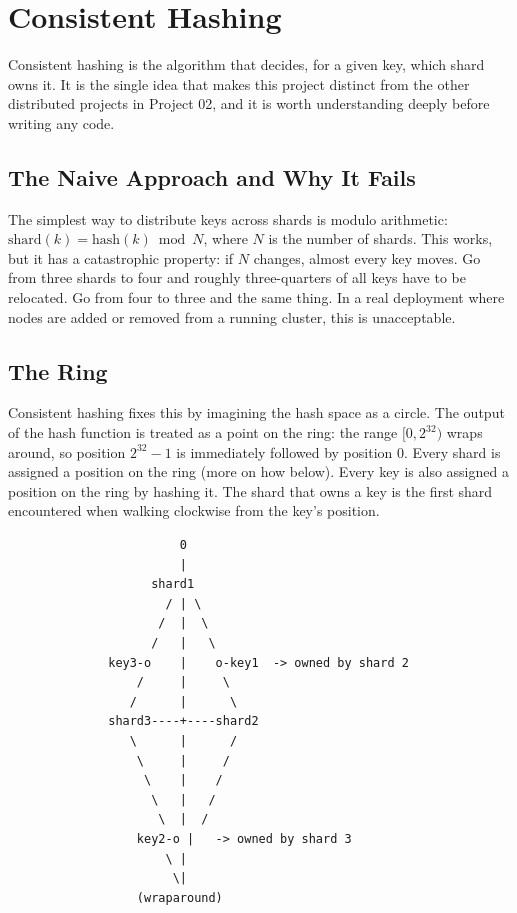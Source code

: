 \documentclass[11pt,a4paper]{article}
\begin{document}
\section{Consistent Hashing}

Consistent hashing is the algorithm that decides, for a given key, which shard owns it. It is the single idea that makes this project distinct from the other distributed projects in Project 02, and it is worth understanding deeply before writing any code.

\subsection{The Naive Approach and Why It Fails}
The simplest way to distribute keys across shards is modulo arithmetic: $\text{shard}(k) = \text{hash}(k) \bmod N$, where $N$ is the number of shards. This works, but it has a catastrophic property: if $N$ changes, almost every key moves. Go from three shards to four and roughly three-quarters of all keys have to be relocated. Go from four to three and the same thing. In a real deployment where nodes are added or removed from a running cluster, this is unacceptable.

\subsection{The Ring}
Consistent hashing fixes this by imagining the hash space as a circle. The output of the hash function is treated as a point on the ring: the range $[0, 2^{32})$ wraps around, so position $2^{32} - 1$ is immediately followed by position 0. Every shard is assigned a position on the ring (more on how below). Every key is also assigned a position on the ring by hashing it. The shard that owns a key is the first shard encountered when walking clockwise from the key's position.

\begin{codebox}
\begin{lstlisting}
                        0
                        |
                    shard1
                      / | \
                     /  |  \
                    /   |   \
              key3-o    |    o-key1  -> owned by shard 2
                  /     |     \
                 /      |      \
              shard3----+----shard2
                 \      |      /
                  \     |     /
                   \    |    /
                    \   |   /
                     \  |  /
                  key2-o |   -> owned by shard 3
                      \ |
                       \|
                  (wraparound)
\end{lstlisting}
\end{codebox}
\end{document}
